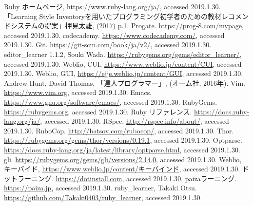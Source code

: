 \begin{thebibliography}{9}

 Ruby ホームページ, \url{https://www.ruby-lang.org/ja/}, accessed 2019.1.30.
 「Learning Style Inventoryを用いたプログラミング初学者のための教材レコメンドシステムの提案」押見太雄, (2017) p.1.
 Progate. \url{https://prog-8.com/mypage}, accessed 2019.1.30.
 codecademy. \url{https://www.codecademy.com/}, accessed 2019.1.30.
  Git. \url{https://git-scm.com/book/ja/v2/}, accessed 2019.1.30.
 editor\_learner 1.1.2, Souki Wada. \url{https://rubygems.org/gems/editor_learner/}, accessed 2019.1.30.
 Weblio, CUI, \url{https://www.weblio.jp/content/CUI}, accessed 2019.1.30.
 Weblio, GUI, \url{https://ejje.weblio.jp/content/GUI}, accessed 2019.1.30.
 Andrew Hunt, David Thomas, 「達人プログラマー」, (オーム社, 2016年).
 Vim. \url{https://www.vim.org}, accessed 2019.1.30.
 Emacs. \url{https://www.gnu.org/software/emacs/}, accessed 2019.1.30.
 RubyGems. \url{https://rubygems.org}, accessed 2019.1.30.
 Ruby リファレンス. \url{https://docs.ruby-lang.org/ja/}, accessed 2019.1.30.  
 RSpec. \url{http://rspec.info/about/}, accessed 2019.1.30.
 RuboCop. \url{http://batsov.com/rubocop/}, accessed 2019.1.30.
 Thor. \url{https://rubygems.org/gems/thor/versions/0.19.1}, accessed 2019.1.30.
 Optparse. \url{https://docs.ruby-lang.org/ja/latest/library/optparse.html}, accessed 2019.1.30.
 gli. \url{https://rubygems.org/gems/gli/versions/2.14.0}, accessed 2019.1.30.
 Weblio, キーバイド, \url{https://www.weblio.jp/content/キーバインド}, accessed 2019.1.30.
 ドットラーニング. \url{https://dotinstall.com}, accessed 2019.1.30.
 paizaラーニング. \url{https://paiza.jp}, accessed 2019.1.30.
 ruby\_learner, Takaki Otsu. \url{https://github.com/Takaki0403/ruby_learner}, accessed 2019.1.30.
\end{thebibliography} 
